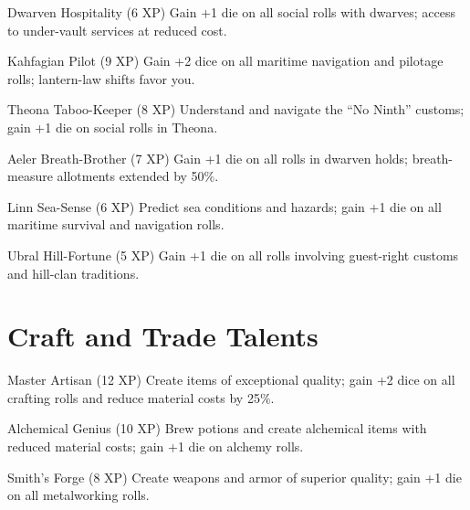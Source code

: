 \documentclass[11pt]{article}
\begin{document}
\begin{talentbox}{Dwarven Hospitality (6 XP)}
Gain +1 die on all social rolls with dwarves; access to under-vault services at reduced cost.
\end{talentbox}

\begin{talentbox}{Kahfagian Pilot (9 XP)}
Gain +2 dice on all maritime navigation and pilotage rolls; lantern-law shifts favor you.
\end{talentbox}

\begin{talentbox}{Theona Taboo-Keeper (8 XP)}
Understand and navigate the ``No Ninth'' customs; gain +1 die on social rolls in Theona.
\end{talentbox}

\begin{talentbox}{Aeler Breath-Brother (7 XP)}
Gain +1 die on all rolls in dwarven holds; breath-measure allotments extended by 50\%.
\end{talentbox}

\begin{talentbox}{Linn Sea-Sense (6 XP)}
Predict sea conditions and hazards; gain +1 die on all maritime survival and navigation rolls.
\end{talentbox}

\begin{talentbox}{Ubral Hill-Fortune (5 XP)}
Gain +1 die on all rolls involving guest-right customs and hill-clan traditions.
\end{talentbox}

\section*{Craft and Trade Talents}

\begin{talentbox}{Master Artisan (12 XP)}
Create items of exceptional quality; gain +2 dice on all crafting rolls and reduce material costs by 25\%.
\end{talentbox}

\begin{talentbox}{Alchemical Genius (10 XP)}
Brew potions and create alchemical items with reduced material costs; gain +1 die on alchemy rolls.
\end{talentbox}

\begin{talentbox}{Smith's Forge (8 XP)}
Create weapons and armor of superior quality; gain +1 die on all metalworking rolls.
\end{talentbox}
\end{document}
